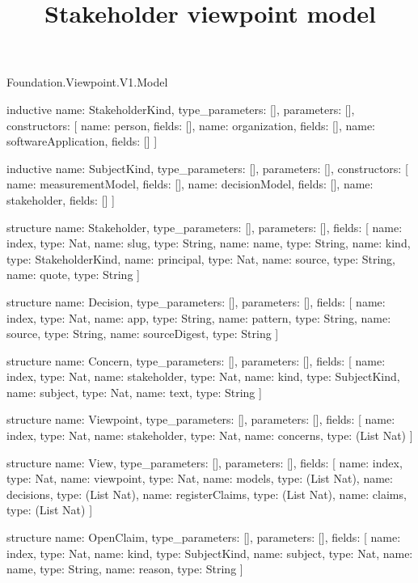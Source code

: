 \begin{lexlean}{Foundation.Viewpoint.V1.Model}
\title{Stakeholder viewpoint model}
\begin{semanticmodule}
inductive{
  name: StakeholderKind,
  type_parameters: [],
  parameters: [],
  constructors: [
    {name: person, fields: []},
    {name: organization, fields: []},
    {name: softwareApplication, fields: []}
  ]
}

inductive{
  name: SubjectKind,
  type_parameters: [],
  parameters: [],
  constructors: [
    {name: measurementModel, fields: []},
    {name: decisionModel, fields: []},
    {name: stakeholder, fields: []}
  ]
}

structure{
  name: Stakeholder,
  type_parameters: [],
  parameters: [],
  fields: [
    {name: index, type: Nat},
    {name: slug, type: String},
    {name: name, type: String},
    {name: kind, type: StakeholderKind},
    {name: principal, type: Nat},
    {name: source, type: String},
    {name: quote, type: String}
  ]
}

structure{
  name: Decision,
  type_parameters: [],
  parameters: [],
  fields: [
    {name: index, type: Nat},
    {name: app, type: String},
    {name: pattern, type: String},
    {name: source, type: String},
    {name: sourceDigest, type: String}
  ]
}

structure{
  name: Concern,
  type_parameters: [],
  parameters: [],
  fields: [
    {name: index, type: Nat},
    {name: stakeholder, type: Nat},
    {name: kind, type: SubjectKind},
    {name: subject, type: Nat},
    {name: text, type: String}
  ]
}

structure{
  name: Viewpoint,
  type_parameters: [],
  parameters: [],
  fields: [
    {name: index, type: Nat},
    {name: stakeholder, type: Nat},
    {name: concerns, type: (List Nat)}
  ]
}

structure{
  name: View,
  type_parameters: [],
  parameters: [],
  fields: [
    {name: index, type: Nat},
    {name: viewpoint, type: Nat},
    {name: models, type: (List Nat)},
    {name: decisions, type: (List Nat)},
    {name: registerClaims, type: (List Nat)},
    {name: claims, type: (List Nat)}
  ]
}

structure{
  name: OpenClaim,
  type_parameters: [],
  parameters: [],
  fields: [
    {name: index, type: Nat},
    {name: kind, type: SubjectKind},
    {name: subject, type: Nat},
    {name: name, type: String},
    {name: reason, type: String}
  ]
}


\end{semanticmodule}
\end{lexlean}
